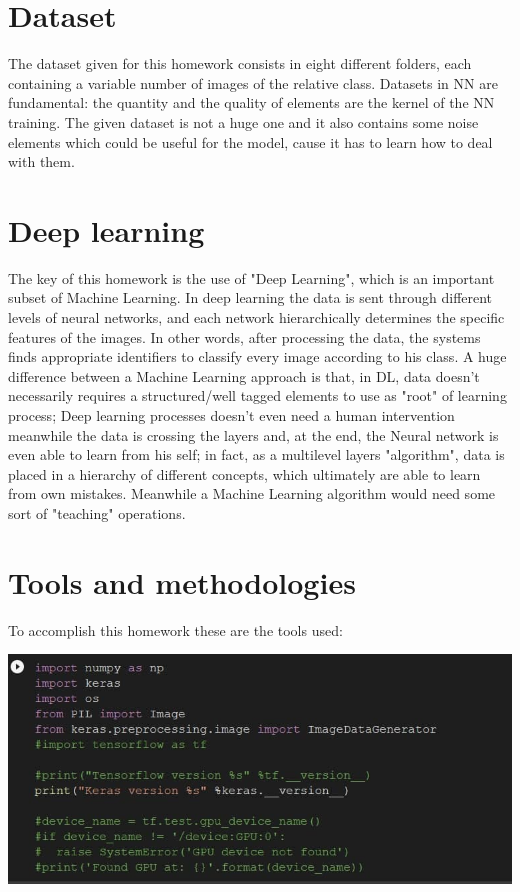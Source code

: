 \documentclass[11pt]{scrartcl}
\begin{document}
\section{Dataset}
\large{The dataset given for this homework consists in eight different folders, each containing a variable number of images of the relative class. \newline
Datasets in NN are fundamental: the quantity and the quality of elements are the kernel of the NN training. \newline
The given dataset is not a huge one and it also contains some noise elements which could be useful for the model, cause it has to learn how to deal with them.} \newline

\vspace{0.5cm}

\section{Deep learning}
\noindent
\large{ \noindent The key of this homework is the use of "Deep Learning", which is an important subset of Machine Learning. \newline 
In deep learning the data is sent through different levels of neural networks, and each network hierarchically determines the specific features of the images. In other words, after processing the data, the systems finds appropriate identifiers to classify every image according to his class. A huge difference between a Machine Learning approach is that, in DL, data doesn't necessarily requires a structured/well tagged elements to use as "root" of learning process; Deep learning processes doesn't even need a human intervention meanwhile the data is crossing the layers and, at the end, the Neural network is even able to learn from his self; in fact, as a multilevel layers "algorithm", data is placed in a hierarchy of different concepts, which ultimately are able to learn from own mistakes. Meanwhile a Machine Learning algorithm would need some sort of "teaching" operations.
}

\newpage

\section{Tools and methodologies}
\noindent
\large{To accomplish this homework these are the tools used:}

\vspace{0.4cm}
\hspace{-0.1in}\includegraphics[width=1\textwidth]{import.png}
\vspace{0.3cm}
\end{document}
